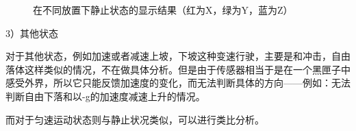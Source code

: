 \begin{figure}[htbp]
\centering

%
%
%

\centering
\caption{在不同放置下静止状态的显示结果（红为X，绿为Y，蓝为Z）}\label{fig:6.2.2}
\end{figure}

\par{3）其他状态}
\par{对于其他状态，例如加速或者减速上坡，下坡这种变速行驶，主要是和冲击，自由落体这样类似的情况，不在做具体分析。但是由于传感器相当于是在一个黑匣子中感受外界，所以它只能反馈加速度的变化，而无法判断具体的方向——例如：无法判断自由下落和以-g的加速度减速上升的情况。}
\par{而对于匀速运动状态则与静止状况类似，可以进行类比分析。}


